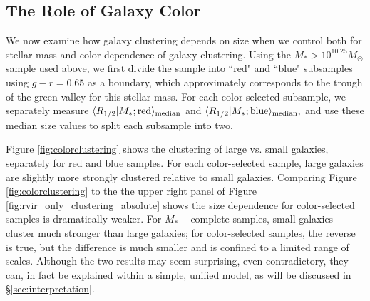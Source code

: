 \documentclass[usenatbib,usegraphicx,letterpaper]{mn2e}
\newcommand{\rhalf}{R_{1/2}}
\newcommand{\mstar}{M_{\ast}}
\newcommand{\median}[2]{\langle{#1}\vert{#2}\rangle_{\rm median}}
\newcommand{\msun}{M_\odot}
\begin{document}
\subsection{The Role of Galaxy Color}
\label{subsec:colormorph}

We now examine how galaxy clustering depends on size when we control both for stellar mass and color dependence of galaxy clustering. Using the $\mstar>10^{10.25}\msun$ sample used above, we first divide the sample into ``red" and ``blue" subsamples using $g-r=0.65$ as a boundary, which approximately corresponds to the trough of the green valley for this stellar mass. For each color-selected subsample, we separately measure $\median{\rhalf}{\mstar; {\rm red}}$ and $\median{\rhalf}{\mstar; {\rm blue}},$ and use these median size values to split each subsample into two.

Figure \ref{fig:colorclustering} shows the clustering of large vs. small galaxies, separately for red and blue samples. For each color-selected sample, large galaxies are slightly more strongly clustered relative to small galaxies. Comparing Figure \ref{fig:colorclustering} to the the upper right panel of Figure \ref{fig:rvir_only_clustering_absolute} shows the size dependence for color-selected samples is dramatically weaker.   For $\mstar-$complete samples, small galaxies cluster much stronger than large galaxies; for color-selected samples, the reverse is true, but the difference is much smaller and is confined to a limited range of scales.  Although the two results may seem surprising, even contradictory, they can, in fact be explained within a simple, unified model, as will be discussed in \S\ref{sec:interpretation}.
\end{document}
